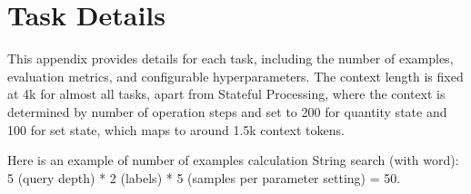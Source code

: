

\section{Task Details}
\label{apd:task_detail}

This appendix provides details for each task, including the number of examples, evaluation metrics, and configurable hyperparameters. The context length is fixed at 4k for almost all tasks, apart from Stateful Processing, where the context is determined by number of operation steps and set to 200 for quantity state and 100 for set state, which maps to around 1.5k context tokens.

Here is an example of number of examples calculation String search (with word):  5 (query depth) *  2 (labels)  * 5 (samples per parameter setting) = 50. 


